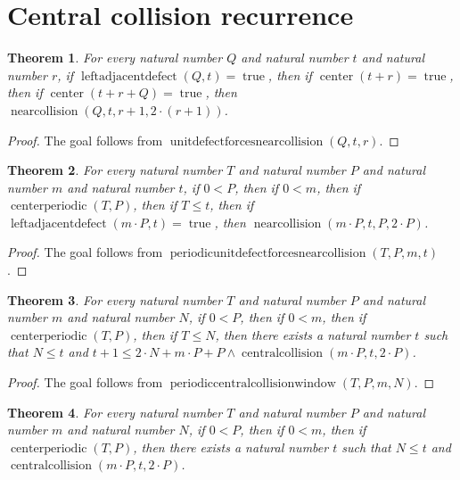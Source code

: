 \documentclass[11pt]{article}
\newtheorem{theorem}{Theorem}[section]
\theoremstyle{definition}
\begin{document}
\section{Central collision recurrence}
\label{ll:observations:central-collisions}
\begin{theorem}
\label{ll:observations:unit-defect-forces-near-collision}
For every natural number \(Q\) and natural number \(t\) and natural number \(r\), if \(\operatorname{leftadjacentdefect}(Q, t) = \operatorname{true}\), then if \(\operatorname{center}(t + r) = \operatorname{true}\), then if \(\operatorname{center}(t + r + Q) = \operatorname{true}\), then \(\operatorname{nearcollision}(Q, t, r + 1, 2 \cdot (r + 1))\).
\end{theorem}
\begin{proof}
The goal follows from \(\operatorname{unitdefectforcesnearcollision}(Q, t, r)\).
\end{proof}
\begin{theorem}
\label{ll:observations:periodic-unit-defect-forces-near-collision}
For every natural number \(T\) and natural number \(P\) and natural number \(m\) and natural number \(t\), if \(0 < P\), then if \(0 < m\), then if \(\operatorname{centerperiodic}(T, P)\), then if \(T \le t\), then if \(\operatorname{leftadjacentdefect}(m \cdot P, t) = \operatorname{true}\), then \(\operatorname{nearcollision}(m \cdot P, t, P, 2 \cdot P)\).
\end{theorem}
\begin{proof}
The goal follows from \(\operatorname{periodicunitdefectforcesnearcollision}(T, P, m, t)\).
\end{proof}
\begin{theorem}
\label{ll:observations:periodic-central-collision-window}
For every natural number \(T\) and natural number \(P\) and natural number \(m\) and natural number \(N\), if \(0 < P\), then if \(0 < m\), then if \(\operatorname{centerperiodic}(T, P)\), then if \(T \le N\), then there exists a natural number \(t\) such that \(N \le t\) and \(t + 1 \le 2 \cdot N + m \cdot P + P \land \operatorname{centralcollision}(m \cdot P, t, 2 \cdot P)\).
\end{theorem}
\begin{proof}
The goal follows from \(\operatorname{periodiccentralcollisionwindow}(T, P, m, N)\).
\end{proof}
\begin{theorem}
\label{ll:observations:periodic-central-collisions}
For every natural number \(T\) and natural number \(P\) and natural number \(m\) and natural number \(N\), if \(0 < P\), then if \(0 < m\), then if \(\operatorname{centerperiodic}(T, P)\), then there exists a natural number \(t\) such that \(N \le t\) and \(\operatorname{centralcollision}(m \cdot P, t, 2 \cdot P)\).
\end{theorem}
\end{document}
